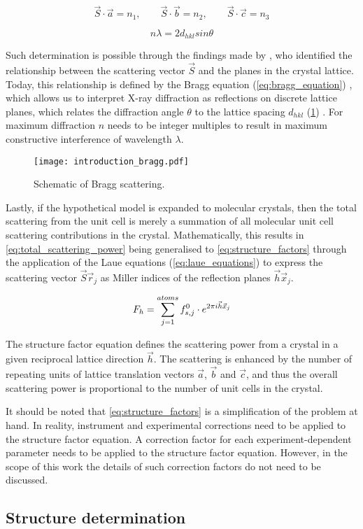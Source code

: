 \begin{equation}
    \vec{S} \cdot \vec{a}=n_1, \quad \quad \vec{S} \cdot \vec{b}=n_2, \quad \quad \vec{S} \cdot \vec{c}=n_3
    \label{eq:laue_equations}
\end{equation}

\begin{equation}
    n\lambda=2d_{hkl}sin\theta
    \label{eq:bragg_equation}
\end{equation}

Such determination is possible through the findings made by \textcite{Bragg1913-cx}, who identified the relationship between the scattering vector $\vec{S}$ and the planes in the crystal lattice. Today, this relationship is defined by the Bragg equation (\cref{eq:bragg_equation}) \cite{Bragg1913-cx}, which allows us to interpret X-ray diffraction as reflections on discrete lattice planes, which relates the diffraction angle $\theta$ to the lattice spacing $d_{hkl}$ (\cref{fig:introduction_bragg}) \cite{Rupp2010-nc}. For maximum diffraction $n$ needs to be integer multiples to result in maximum constructive interference of wavelength $\lambda$.

\begin{figure}[H]
    \centering
    \texttt{[image: introduction\_bragg.pdf]}
    \caption{Schematic of Bragg scattering.}
    \label{fig:introduction_bragg}
\end{figure}

Lastly, if the hypothetical model is expanded to molecular crystals, then the total scattering from the unit cell is merely a summation of all molecular unit cell scattering contributions in the crystal. Mathematically, this results in \cref{eq:total_scattering_power} being generalised to \cref{eq:structure_factors} through the application of the Laue equations (\cref{eq:laue_equations}) to express the scattering vector $\vec{S}\vec{r}_j$ as Miller indices of the reflection planes $\vec{h}\vec{x}_j$. 

\begin{equation}
    F_h=\sum_{j=1}^{atoms}f_{s,j}^0 \cdot e^{2\pi\\i\vec{h}\vec{x}_j}
    \label{eq:structure_factors}
\end{equation}

The structure factor equation defines the scattering power from a crystal in a given reciprocal lattice direction $\vec{h}$. The scattering is enhanced by the number of repeating units of lattice translation vectors $\vec{a}$, $\vec{b}$ and $\vec{c}$, and thus the overall scattering power is proportional to the number of unit cells in the crystal.

It should be noted that \cref{eq:structure_factors} is a simplification of the problem at hand. In reality, instrument and experimental corrections need to be applied to the structure factor equation. A correction factor for each experiment-dependent parameter needs to be applied to the structure factor equation. However, in the scope of this work the details of such correction factors do not need to be discussed.

\subsection{Structure determination}
